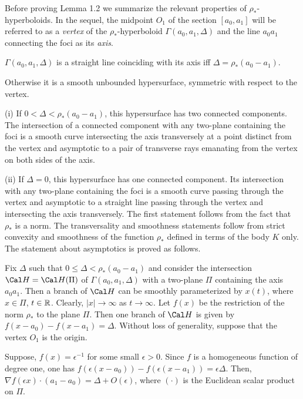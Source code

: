 Before proving Lemma 1.2 we summarize the relevant properties of
$\rho_*$-hyperboloids. In the sequel, the midpoint $O_1$ of the
section $[a_0,a_1]$ will be referred to as a {\it vertex} of the
$\rho_*$-hyperboloid $\Gamma(a_0,a_1, \Delta)$ and the line
$a_0a_1$ connecting the foci as its {\it axis}.
 \roster
\item
$\Gamma(a_0,a_1,\Delta)$ is a straight
line coinciding with its axis iff $\Delta=\rho_*(a_0-a_1)$.
\item
Otherwise it is a smooth unbounded hypersurface,
symmetric with respect to the vertex.

(i) If $0<\Delta<\rho_*(a_0-a_1)$, this hypersurface has two
connected components. The intersection of a connected component
with any two-plane containing the foci is a smooth curve
intersecting the axis transversely at a point distinct from the
vertex and asymptotic to a pair of transverse rays emanating
from the vertex on both sides of the axis.


(ii) If $\Delta=0$, this hypersurface has one connected
component. Its intersection  with any two-plane containing the
foci is a  smooth curve passing through the  vertex and
asymptotic to a straight line passing through the vertex and
intersecting the axis transversely.
\endroster
\endproclaim
The first statement follows from the fact that
$\rho_* $ is a norm. The transversality and smoothness statements
follow from strict convexity and smoothness of the function
$\rho_*$ defined in terms of the body $K$ only.
The statement about asymptotics is proved as follows.


Fix $\Delta$ such that $0\leq\Delta<\rho_*(a_0-a_1)$ and  consider the
intersection ${\Cal H}={\Cal H}(\Pi)$ of
$\Gamma(a_0,a_1,\Delta)$ with a two-plane $\Pi$ containing the
axis $a_0a_1$. Then a branch of ${\Cal H}$ can be smoothly
parameterized
by $x(t)$, where $x\in \Pi$, $t\in{\Bbb R}$. Clearly,
$|x|\rightarrow\infty$ as $t\rightarrow\infty$.
Let $f(x)$ be the restriction of the norm $\rho_*$ to the plane $\Pi$.
Then one branch of ${\Cal H}$ is given by $f(x-a_0)-f(x-a_1)=\Delta$.
Without loss of generality, suppose that the vertex $O_1$
is the origin.

Suppose, $f(x)=\epsilon^{-1}$ for some small $\epsilon>0$. Since $f$
is a homogeneous function of degree one, one has
$f(\epsilon(x-a_0))-f(\epsilon(x-a_1))=\epsilon\Delta$. Then,
$\nabla f(\epsilon x)\cdot (a_1-a_0)=\Delta+O(\epsilon)$,
where $(\cdot)$ is the Euclidean scalar product on $\Pi$.

